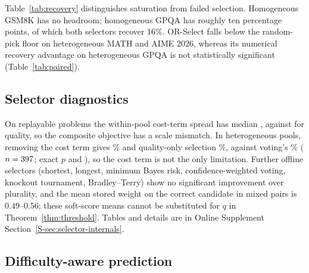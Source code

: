 \documentclass[preprint,11pt,number,sort&compress]{elsarticle}
\begin{document}
Table~\ref{tab:recovery} distinguishes saturation from failed selection.
Homogeneous GSM8K has no headroom; homogeneous GPQA has roughly ten
percentage points, of which both selectors recover 16\%.
OR-Select falls below the random-pick floor on heterogeneous MATH and
AIME 2026, whereas its numerical recovery advantage on heterogeneous GPQA
is not statistically significant (Table~\ref{tab:paired}).

\begin{table}[htbp]
\centering
\caption{Headroom and recovery on graded problems. Floor: mean candidate
accuracy. Oracle: some candidate correct. Recovery (\%):
$(\text{acc}-\text{floor})/(\text{oracle}-\text{floor})$; negative means
below a random pick.}
\label{tab:recovery}
\small\setlength{\tabcolsep}{4pt}
\end{table}

\subsection{Selector diagnostics}
\label{sec:selection-bias}

On replayable problems the within-pool cost-term spread has median \CostSpreadMed{}, against
\QualitySpreadMed{} for quality, so the composite objective has a scale mismatch. In heterogeneous pools,
removing the cost term gives \AblHetNoCostAcc\% and quality-only selection \AblHetQOnlyAcc\%, against voting's
\AblHetSCAcc\% ($n=397$; exact $p$ \AblHetNoCostP{} and \AblHetQOnlyP{}), so the cost term is not the only
limitation. Further offline selectors (shortest, longest, minimum Bayes risk, confidence-weighted voting,
knockout tournament, Bradley--Terry) show no significant improvement over plurality, and the mean stored weight
on the correct candidate in mixed pairs is $0.49$--$0.56$; these soft-score means cannot be substituted for $q$
in Theorem~\ref{thm:threshold}. Tables and details are in Online Supplement Section~\ref{S-sec:selector-internals}.

\subsection{Difficulty-aware prediction}
\label{sec:mixture-results}
\end{document}
